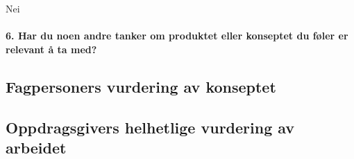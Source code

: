 Nei

\paragraph{6. Har du noen andre tanker om produktet eller konseptet du føler er relevant å ta med?}


\subsection{Fagpersoners vurdering av konseptet}

\subsection{Oppdragsgivers helhetlige vurdering av arbeidet}



